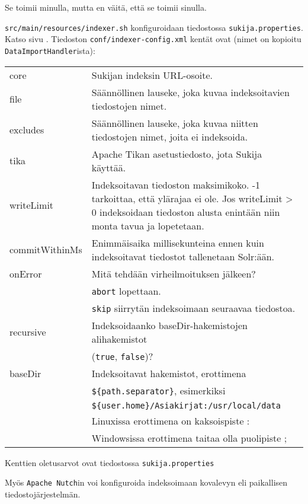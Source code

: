 \documentclass[12pt]{article}
\begin{document}
Se toimii minulla, mutta en väitä, että se toimii sinulla.

\verb=src/main/resources/indexer.sh= konfiguroidaan tiedostossa
\verb|sukija.properties|. Katso sivu .
Tiedoston \verb=conf/indexer-config.xml= kentät ovat
(nimet on kopioitu \verb=DataImportHandler=ista):


\begin{tabularx}{\textwidth}{@{}lX}
core           & Sukijan indeksin URL-osoite. \\
file           & Säännöllinen lauseke, joka kuvaa indeksoitavien tiedostojen nimet. \\
excludes       & Säännöllinen lauseke, joka kuvaa niitten tiedostojen nimet, joita ei indeksoida. \\
tika           & Apache Tikan asetustiedosto, jota Sukija käyttää. \\
writeLimit     & Indeksoitavan tiedoston maksimikoko. -1 tarkoittaa, että ylärajaa ei ole.
                 Jos writeLimit > 0 indeksoidaan tiedoston alusta enintään niin monta tavua ja lopetetaan. \\
commitWithinMs & Enimmäisaika millisekunteina ennen kuin indeksoitavat tiedostot tallenetaan Solr:ään. \\
onError        & Mitä tehdään virheilmoituksen jälkeen? \\
               & \texttt{abort} lopettaan. \\
               & \texttt{skip} siirrytän indeksoimaan seuraavaa tiedostoa. \\
recursive      & Indeksoidaanko baseDir-hakemistojen alihakemistot \\
               & (\texttt{true}, \texttt{false})? \\
baseDir        & Indeksoitavat hakemistot, erottimena \\
               & \texttt{\$\{path.separator\}}, esimerkiksi \\
               & \texttt{\$\{user.home\}/Asiakirjat:/usr/local/data} \\
               & Linuxissa erottimena on kaksoispiste : \\
               & Windowsissa erottimena taitaa olla puolipiste ;
\end{tabularx}

Kenttien oletusarvot ovat tiedostossa \verb=sukija.properties=

Myös \verb=Apache Nutch=in voi konfiguroida indeksoimaan kovalevyn
eli paikallisen tiedostojärjestelmän.
\end{document}
